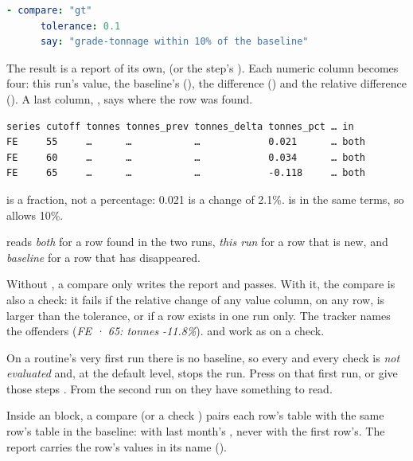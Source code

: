 \begin{lstlisting}[language=yaml]
    - compare: "gt"
      tolerance: 0.1
      say: "grade-tonnage within 10% of the baseline"
\end{lstlisting}

The result is a report of its own,  (or the step's ). Each numeric column becomes four: this run's value, the baseline's (), the difference () and the relative difference (). A last column, , says where the row was found.

\begin{lstlisting}
series cutoff tonnes tonnes_prev tonnes_delta tonnes_pct … in
FE     55     …      …           …            0.021      … both
FE     60     …      …           …            0.034      … both
FE     65     …      …           …            -0.118     … both
\end{lstlisting}

\begin{note}
 is a fraction, not a percentage: 0.021 is a change of 2.1\%.  is in the same terms, so  allows 10\%.
\end{note}

 reads \emph{both} for a row found in the two runs, \emph{this run} for a row that is new, and \emph{baseline} for a row that has disappeared.

Without , a compare only writes the report and passes. With it, the compare is also a check: it fails if the relative change of any value column, on any row, is larger than the tolerance, or if a row exists in one run only. The tracker names the offenders (\emph{FE · 65: tonnes -11.8\%}).  and  work as on a check.

\begin{caution}
On a routine's very first run there is no baseline, so every  and every check  is \emph{not evaluated} and, at the default level, stops the run. Press  on that first run, or give those steps . From the second run on they have something to read.
\end{caution}

Inside an  block, a compare (or a check ) pairs each row's table with the same row's table in the baseline:  with last month's , never with the first row's. The report carries the row's values in its name ().

